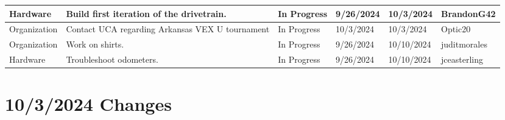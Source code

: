 \begin{center}
\begin{longtable}{| p{40pt} | p{150pt} | p{35pt} | p{33pt} | p{33pt} | p{40pt} |}
\hline \rowcolor{LightGoldenrod1}
Hardware & Build first iteration of the drivetrain. & In Progress & 9/26/2024 & 10/3/2024 & BrandonG42 \\
\hline \rowcolor{LightGoldenrod1}
Organization & Contact UCA regarding Arkansas VEX U tournament & In Progress & 10/3/2024 & 10/3/2024 & Optic20 \\
\hline \rowcolor{LightGoldenrod1}
Organization & Work on shirts. & In Progress & 9/26/2024 & 10/10/2024 & juditmorales \\
\hline \rowcolor{LightGoldenrod1}
Hardware & Troubleshoot odometers. & In Progress & 9/26/2024 & 10/10/2024 & jceasterling \\
\hline
\end{longtable}
\end{center}


\section{10/3/2024 Changes}
